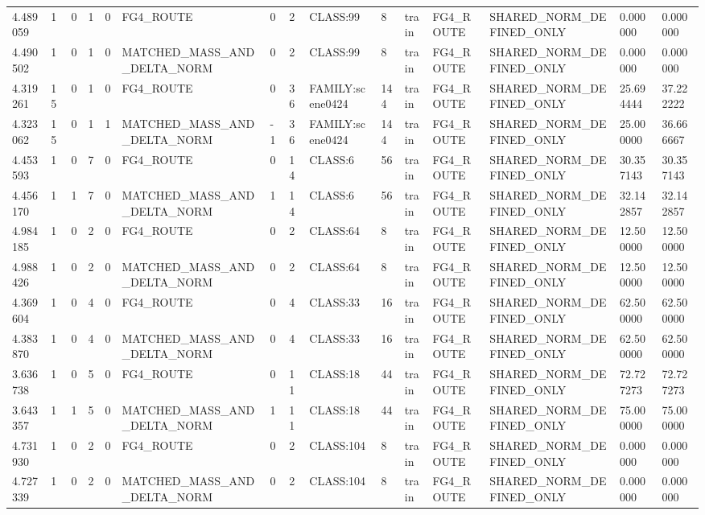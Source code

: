 \begin{tabular}{lllllllllllllll}
4.489059 & 1 & 0 & 1 & 0 & FG4\_ROUTE & 0 & 2 & CLASS:99 & 8 & train & FG4\_ROUTE & SHARED\_NORM\_DEFINED\_ONLY & 0.000000 & 0.000000 \\
4.490502 & 1 & 0 & 1 & 0 & MATCHED\_MASS\_AND\_DELTA\_NORM & 0 & 2 & CLASS:99 & 8 & train & FG4\_ROUTE & SHARED\_NORM\_DEFINED\_ONLY & 0.000000 & 0.000000 \\
4.319261 & 15 & 0 & 1 & 0 & FG4\_ROUTE & 0 & 36 & FAMILY:scene0424 & 144 & train & FG4\_ROUTE & SHARED\_NORM\_DEFINED\_ONLY & 25.694444 & 37.222222 \\
4.323062 & 15 & 0 & 1 & 1 & MATCHED\_MASS\_AND\_DELTA\_NORM & -1 & 36 & FAMILY:scene0424 & 144 & train & FG4\_ROUTE & SHARED\_NORM\_DEFINED\_ONLY & 25.000000 & 36.666667 \\
4.453593 & 1 & 0 & 7 & 0 & FG4\_ROUTE & 0 & 14 & CLASS:6 & 56 & train & FG4\_ROUTE & SHARED\_NORM\_DEFINED\_ONLY & 30.357143 & 30.357143 \\
4.456170 & 1 & 1 & 7 & 0 & MATCHED\_MASS\_AND\_DELTA\_NORM & 1 & 14 & CLASS:6 & 56 & train & FG4\_ROUTE & SHARED\_NORM\_DEFINED\_ONLY & 32.142857 & 32.142857 \\
4.984185 & 1 & 0 & 2 & 0 & FG4\_ROUTE & 0 & 2 & CLASS:64 & 8 & train & FG4\_ROUTE & SHARED\_NORM\_DEFINED\_ONLY & 12.500000 & 12.500000 \\
4.988426 & 1 & 0 & 2 & 0 & MATCHED\_MASS\_AND\_DELTA\_NORM & 0 & 2 & CLASS:64 & 8 & train & FG4\_ROUTE & SHARED\_NORM\_DEFINED\_ONLY & 12.500000 & 12.500000 \\
4.369604 & 1 & 0 & 4 & 0 & FG4\_ROUTE & 0 & 4 & CLASS:33 & 16 & train & FG4\_ROUTE & SHARED\_NORM\_DEFINED\_ONLY & 62.500000 & 62.500000 \\
4.383870 & 1 & 0 & 4 & 0 & MATCHED\_MASS\_AND\_DELTA\_NORM & 0 & 4 & CLASS:33 & 16 & train & FG4\_ROUTE & SHARED\_NORM\_DEFINED\_ONLY & 62.500000 & 62.500000 \\
3.636738 & 1 & 0 & 5 & 0 & FG4\_ROUTE & 0 & 11 & CLASS:18 & 44 & train & FG4\_ROUTE & SHARED\_NORM\_DEFINED\_ONLY & 72.727273 & 72.727273 \\
3.643357 & 1 & 1 & 5 & 0 & MATCHED\_MASS\_AND\_DELTA\_NORM & 1 & 11 & CLASS:18 & 44 & train & FG4\_ROUTE & SHARED\_NORM\_DEFINED\_ONLY & 75.000000 & 75.000000 \\
4.731930 & 1 & 0 & 2 & 0 & FG4\_ROUTE & 0 & 2 & CLASS:104 & 8 & train & FG4\_ROUTE & SHARED\_NORM\_DEFINED\_ONLY & 0.000000 & 0.000000 \\
4.727339 & 1 & 0 & 2 & 0 & MATCHED\_MASS\_AND\_DELTA\_NORM & 0 & 2 & CLASS:104 & 8 & train & FG4\_ROUTE & SHARED\_NORM\_DEFINED\_ONLY & 0.000000 & 0.000000 \\

\end{tabular}
